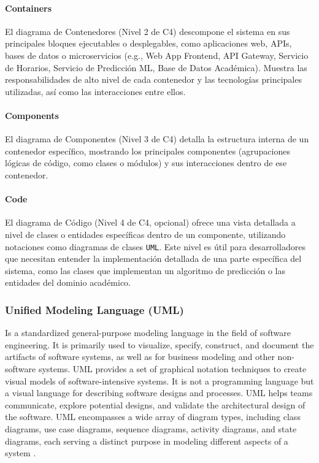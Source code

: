 \paragraph{Containers}
El diagrama de Contenedores (Nivel 2 de C4) descompone el sistema en sus principales bloques ejecutables o desplegables, como aplicaciones web, APIs, bases de datos o microservicios (e.g., Web App Frontend, API Gateway, Servicio de Horarios, Servicio de Predicción ML, Base de Datos Académica).
Muestra las responsabilidades de alto nivel de cada contenedor y las tecnologías principales utilizadas, así como las interacciones entre ellos.

\paragraph{Components}
El diagrama de Componentes (Nivel 3 de C4) detalla la estructura interna de un contenedor específico, mostrando los principales componentes (agrupaciones lógicas de código, como clases o módulos) y sus interacciones dentro de ese contenedor.

\paragraph{Code}
El diagrama de Código (Nivel 4 de C4, opcional) ofrece una vista detallada a nivel de clases o entidades específicas dentro de un componente, utilizando notaciones como diagramas de clases \texttt{UML}.
Este nivel es útil para desarrolladores que necesitan entender la implementación detallada de una parte específica del sistema, como las clases que implementan un algoritmo de predicción o las entidades del dominio académico.

\subsubsection{Unified Modeling Language (UML)}
Is a standardized general-purpose modeling language in the field of software engineering.
It is primarily used to visualize, specify, construct, and document the artifacts of software systems, as well as for business modeling and other non-software systems.
UML provides a set of graphical notation techniques to create visual models of software-intensive systems.
It is not a programming language but a visual language for describing software designs and processes.
UML helps teams communicate, explore potential designs, and validate the architectural design of the software.
UML encompasses a wide array of diagram types, including class diagrams, use case diagrams, sequence diagrams, activity diagrams, and state diagrams, each serving a distinct purpose in modeling different aspects of a system \cite{OMG2017, Fowler2003}.
